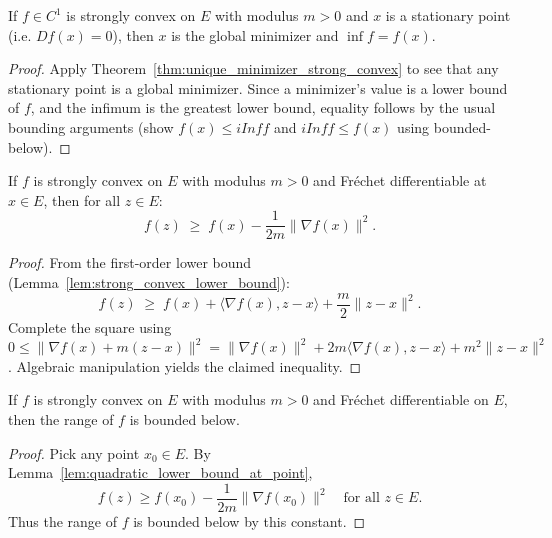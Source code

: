\begin{theorem}\label{thm:isMinOn_of_stationary}
  \leanok{}
  If $f\in C^1$ is strongly convex on $E$ with modulus $m>0$ and $x$ is a stationary point
  (i.e. $Df(x)=0$), then $x$ is the global minimizer and $\inf f = f(x)$.
\end{theorem}
\begin{proof}
  \leanok{}
  Apply Theorem~\ref{thm:unique_minimizer_strong_convex} to see that any stationary point is a global minimizer.
  Since a minimizer's value is a lower bound of $f$, and the infimum is the greatest lower bound, equality follows
  by the usual bounding arguments (show $f(x)\le iInf f$ and $iInf f \le f(x)$ using bounded-below).
\end{proof}

\begin{lemma}\label{lem:quadratic_lower_bound_at_point}
  \leanok{}
  If $f$ is strongly convex on $E$ with modulus $m > 0$ and Fr\'echet differentiable at $x \in E$,
  then for all $z \in E$:
  \[
    f(z) \;\ge\; f(x) - \frac{1}{2m}\|\nabla f(x)\|^2.
  \]
\end{lemma}

\begin{proof}
  \leanok{}
  From the first-order lower bound (Lemma~\ref{lem:strong_convex_lower_bound}):
  \[
    f(z) \;\ge\; f(x) + \langle \nabla f(x), z - x\rangle + \frac{m}{2}\|z - x\|^2.
  \]
  Complete the square using $0 \le \|\nabla f(x) + m(z-x)\|^2 = \|\nabla f(x)\|^2 + 2m\langle \nabla f(x), z - x\rangle + m^2\|z-x\|^2$.
  Algebraic manipulation yields the claimed inequality.
\end{proof}

\begin{lemma}\label{lem:StrongConvexOn_bddBelow_from_differentiable}
  \leanok{}
  If $f$ is strongly convex on $E$ with modulus $m > 0$ and Fr\'echet differentiable on $E$,
  then the range of $f$ is bounded below.
\end{lemma}

\begin{proof}
  \leanok{}
  Pick any point $x_0 \in E$. By Lemma~\ref{lem:quadratic_lower_bound_at_point},
  \[
    f(z) \ge f(x_0) - \frac{1}{2m}\|\nabla f(x_0)\|^2 \quad \text{for all } z \in E.
  \]
  Thus the range of $f$ is bounded below by this constant.
\end{proof}

